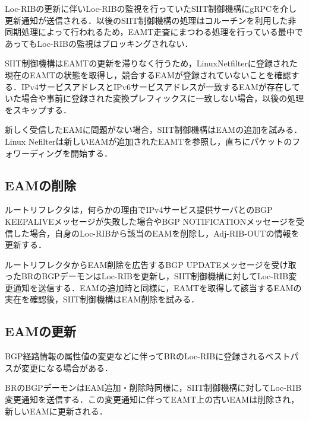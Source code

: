 Loc-RIBの更新に伴いLoc-RIBの監視を行っていたSIIT制御機構にgRPCを介し更新通知が送信される．以後のSIIT制御機構の処理はコルーチンを利用した非同期処理によって行われるため，EAMT走査にまつわる処理を行っている最中であってもLoc-RIBの監視はブロッキングされない．

SIIT制御機構はEAMTの更新を滞りなく行うため，LinuxNetfilterに登録された現在のEAMTの状態を取得し，競合するEAMが登録されていないことを確認する．IPv4サービスアドレスとIPv6サービスアドレスが一致するEAMが存在していた場合や事前に登録された変換プレフィックスに一致しない場合，以後の処理をスキップする．

新しく受信したEAMに問題がない場合，SIIT制御機構はEAMの追加を試みる．Linux Nefilterは新しいEAMが追加されたEAMTを参照し，直ちにパケットのフォワーディングを開始する．

\subsection{EAMの削除}
ルートリフレクタは，何らかの理由でIPv4サービス提供サーバとのBGP KEEPALIVEメッセージが失敗した場合やBGP NOTIFICATIONメッセージを受信した場合，自身のLoc-RIBから該当のEAMを削除し，Adj-RIB-OUTの情報を更新する．

ルートリフレクタからEAM削除を広告するBGP UPDATEメッセージを受け取ったBRのBGPデーモンはLoc-RIBを更新し，SIIT制御機構に対してLoc-RIB変更通知を送信する．EAMの追加時と同様に，EAMTを取得して該当するEAMの実在を確認後，SIIT制御機構はEAM削除を試みる．

\subsection{EAMの更新}
BGP経路情報の属性値の変更などに伴ってBRのLoc-RIBに登録されるベストパスが変更になる場合がある．

BRのBGPデーモンはEAM追加・削除時同様に，SIIT制御機構に対してLoc-RIB変更通知を送信する．この変更通知に伴ってEAMT上の古いEAMは削除され，新しいEAMに更新される．




